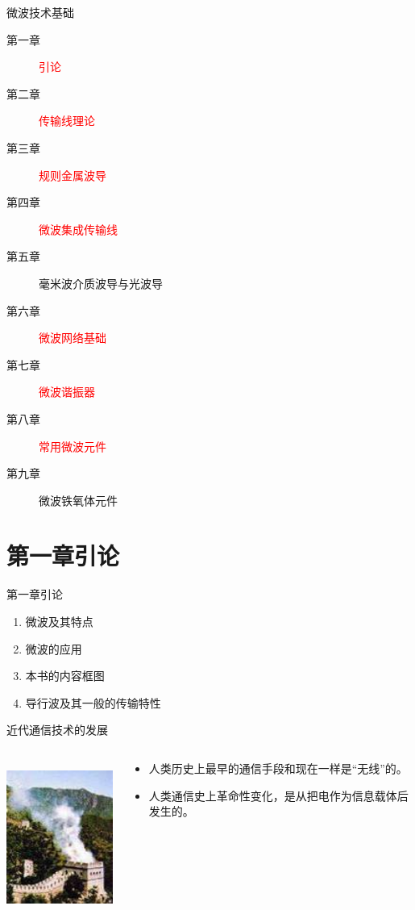 \documentclass{beamer}
\begin{document}
\begin{frame}{微波技术基础}
  \begin{description}
    \item[第一章] \textcolor{red}{引论}
    \item[第二章] \textcolor{red}{传输线理论}
    \item[第三章] \textcolor{red}{规则金属波导}
    \item[第四章] \textcolor{red}{微波集成传输线}
    \item[第五章] 毫米波介质波导与光波导
    \item[第六章] \textcolor{red}{微波网络基础}
    \item[第七章] \textcolor{red}{微波谐振器}
    \item[第八章] \textcolor{red}{常用微波元件}
    \item[第九章] 微波铁氧体元件
  \end{description}
\end{frame}

\section{第一章\quad 引论}
\begin{frame}{第一章\quad 引论}
  \begin{enumerate}
    \item 微波及其特点
    \item 微波的应用
    \item 本书的内容框图
    \item 导行波及其一般的传输特性
  \end{enumerate}
\end{frame}

\begin{frame}{近代通信技术的发展}
  \begin{columns}
    \begin{column}{0.35\linewidth}
      \centering
      \includegraphics[height=5cm]{fenghuotai}
    \end{column}
    \begin{column}{0.65\linewidth}
      \centering
      \begin{itemize}
        \item 人类历史上最早的通信手段和现在一样是“无线”的。
        \item 人类通信史上革命性变化，是从把电作为信息载体后发生的。
      \end{itemize}
    \end{column}
  \end{columns}
\end{frame}
\end{document}
